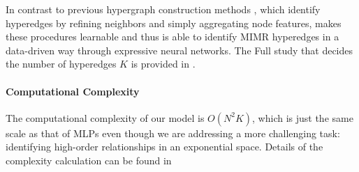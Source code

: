 In contrast to previous hypergraph construction methods \citep{jin2019robust,xiao2019multi}, which identify hyperedges by refining neighbors and simply aggregating node features, \hybrid{} makes these procedures learnable and thus is able to identify MIMR hyperedges in a data-driven way through expressive neural networks. The Full study that decides the number of hyperedges $K$ is provided in \cite{qiu2023learning}.

\paragraph{Computational Complexity}
The computational complexity of our model is $O(N^2K)$, which is just the same scale as that of MLPs even though we are addressing a more challenging task: identifying high-order relationships in an exponential space. Details of the complexity calculation can be found in \cite{qiu2023learning}


